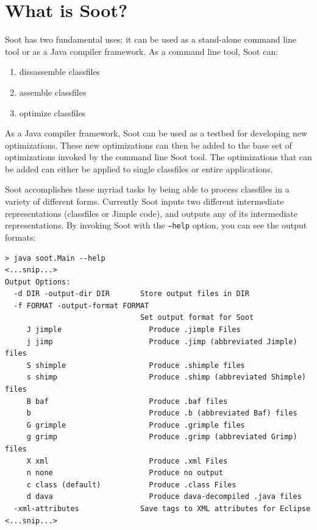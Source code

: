 \documentclass{article}
\begin{document}
\section{What is Soot?}

Soot has two fundamental uses; it can be used as a stand-alone command
line tool or as a Java compiler framework.  As a command line tool,
Soot can:
\begin{enumerate}
\item dissassemble classfiles
\item assemble classfiles
\item optimize classfiles
\end{enumerate}

As a Java compiler framework, Soot can be used as a testbed for
developing new optimizations.  These new optimizations can then be
added to the base set of optimizations invoked by the command line
Soot tool.  The optimizations that can be added can either be applied
to single classfiles or entire applications.

Soot accomplishes these myriad tasks by being able to process
classfiles in a variety of different forms.  Currently Soot inputs two
different intermediate representations (classfiles or Jimple code),
and outputs any of its intermediate representations.  By invoking Soot with
the \texttt{--help} option,
you can see the output formats:

\begin{verbatim}
> java soot.Main --help
<...snip...>
Output Options:
  -d DIR -output-dir DIR       Store output files in DIR 
  -f FORMAT -output-format FORMAT
                               Set output format for Soot 
     J jimple                    Produce .jimple Files 
     j jimp                      Produce .jimp (abbreviated Jimple) files 
     S shimple                   Produce .shimple files 
     s shimp                     Produce .shimp (abbreviated Shimple) files 
     B baf                       Produce .baf files 
     b                           Produce .b (abbreviated Baf) files 
     G grimple                   Produce .grimple files 
     g grimp                     Produce .grimp (abbreviated Grimp) files 
     X xml                       Produce .xml Files 
     n none                      Produce no output 
     c class (default)           Produce .class Files 
     d dava                      Produce dava-decompiled .java files 
  -xml-attributes              Save tags to XML attributes for Eclipse 
<...snip...>
\end{verbatim}
\end{document}
